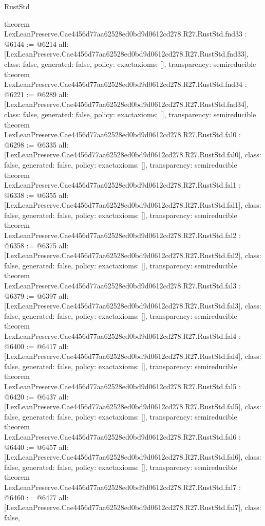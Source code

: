 \begin{lexlean}{RustStd}
\begin{coremodule}
{}
theorem LexLeanPreserve.Cae4456d77aa62528ed0bd9d0612cd278.R27.RustStd.fnd33 : @6144 := @6214 {
  all: [LexLeanPreserve.Cae4456d77aa62528ed0bd9d0612cd278.R27.RustStd.fnd33],
  class: false,
  generated: false,
  policy: exact{axioms: []},
  transparency: semireducible
}
theorem LexLeanPreserve.Cae4456d77aa62528ed0bd9d0612cd278.R27.RustStd.fnd34 : @6221 := @6289 {
  all: [LexLeanPreserve.Cae4456d77aa62528ed0bd9d0612cd278.R27.RustStd.fnd34],
  class: false,
  generated: false,
  policy: exact{axioms: []},
  transparency: semireducible
}
theorem LexLeanPreserve.Cae4456d77aa62528ed0bd9d0612cd278.R27.RustStd.fal0 : @6298 := @6335 {
  all: [LexLeanPreserve.Cae4456d77aa62528ed0bd9d0612cd278.R27.RustStd.fal0],
  class: false,
  generated: false,
  policy: exact{axioms: []},
  transparency: semireducible
}
theorem LexLeanPreserve.Cae4456d77aa62528ed0bd9d0612cd278.R27.RustStd.fal1 : @6338 := @6355 {
  all: [LexLeanPreserve.Cae4456d77aa62528ed0bd9d0612cd278.R27.RustStd.fal1],
  class: false,
  generated: false,
  policy: exact{axioms: []},
  transparency: semireducible
}
theorem LexLeanPreserve.Cae4456d77aa62528ed0bd9d0612cd278.R27.RustStd.fal2 : @6358 := @6375 {
  all: [LexLeanPreserve.Cae4456d77aa62528ed0bd9d0612cd278.R27.RustStd.fal2],
  class: false,
  generated: false,
  policy: exact{axioms: []},
  transparency: semireducible
}
theorem LexLeanPreserve.Cae4456d77aa62528ed0bd9d0612cd278.R27.RustStd.fal3 : @6379 := @6397 {
  all: [LexLeanPreserve.Cae4456d77aa62528ed0bd9d0612cd278.R27.RustStd.fal3],
  class: false,
  generated: false,
  policy: exact{axioms: []},
  transparency: semireducible
}
theorem LexLeanPreserve.Cae4456d77aa62528ed0bd9d0612cd278.R27.RustStd.fal4 : @6400 := @6417 {
  all: [LexLeanPreserve.Cae4456d77aa62528ed0bd9d0612cd278.R27.RustStd.fal4],
  class: false,
  generated: false,
  policy: exact{axioms: []},
  transparency: semireducible
}
theorem LexLeanPreserve.Cae4456d77aa62528ed0bd9d0612cd278.R27.RustStd.fal5 : @6420 := @6437 {
  all: [LexLeanPreserve.Cae4456d77aa62528ed0bd9d0612cd278.R27.RustStd.fal5],
  class: false,
  generated: false,
  policy: exact{axioms: []},
  transparency: semireducible
}
theorem LexLeanPreserve.Cae4456d77aa62528ed0bd9d0612cd278.R27.RustStd.fal6 : @6440 := @6457 {
  all: [LexLeanPreserve.Cae4456d77aa62528ed0bd9d0612cd278.R27.RustStd.fal6],
  class: false,
  generated: false,
  policy: exact{axioms: []},
  transparency: semireducible
}
theorem LexLeanPreserve.Cae4456d77aa62528ed0bd9d0612cd278.R27.RustStd.fal7 : @6460 := @6477 {
  all: [LexLeanPreserve.Cae4456d77aa62528ed0bd9d0612cd278.R27.RustStd.fal7],
  class: false,
}
\end{coremodule}
\end{lexlean}

